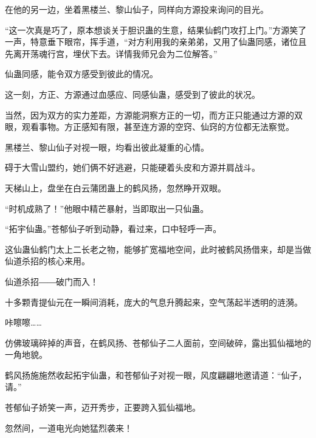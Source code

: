 \begin{this_body}
在他的另一边，坐着黑楼兰、黎山仙子，同样向方源投来询问的目光。

“这一次真是巧了，原本想谈关于胆识蛊的生意，结果仙鹤门攻打上门。”方源笑了一声，特意垂下眼帘，挥手道，“对方利用我的亲弟弟，又用了仙蛊同感，诸位且先离开荡魂行宫，埋伏下去。详情我师兄会为二位解答。”

仙蛊同感，能令双方感受到彼此的情况。

这一刻，方正、方源通过血感应、同感仙蛊，感受到了彼此的状况。

当然，因为双方的实力差距，方源能洞察方正的一切，而方正只能通过方源的双眼，观看事物。方正感知有限，甚至连方源的空窍、仙窍的方位都无法察觉。

黑楼兰、黎山仙子对视一眼，均看出彼此凝重的心情。

碍于大雪山盟约，她们俩不好逃避，只能硬着头皮和方源并肩战斗。

天梯山上，盘坐在白云蒲团蛊上的鹤风扬，忽然睁开双眼。

“时机成熟了！”他眼中精芒暴射，当即取出一只仙蛊。

“拓宇仙蛊。”苍郁仙子听到动静，看过来，口中轻呼一声。

这仙蛊仙鹤门太上二长老之物，能够扩宽福地空间，此时被鹤风扬借来，却是当做仙道杀招的核心来用。

仙道杀招――破门而入！

十多颗青提仙元在一瞬间消耗，庞大的气息升腾起来，空气荡起半透明的涟漪。

咔嚓嚓……

仿佛玻璃碎掉的声音，在鹤风扬、苍郁仙子二人面前，空间破碎，露出狐仙福地的一角地貌。

鹤风扬施施然收起拓宇仙蛊，和苍郁仙子对视一眼，风度翩翩地邀请道：“仙子，请。”

苍郁仙子娇笑一声，迈开秀步，正要跨入狐仙福地。

忽然间，一道电光向她猛烈袭来！

\end{this_body}

